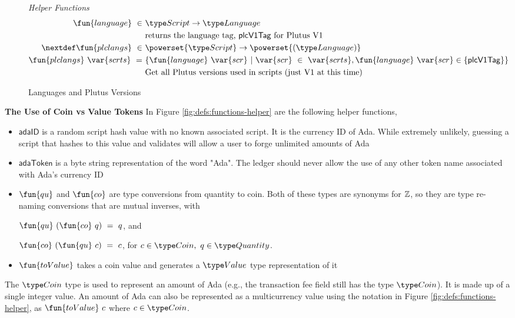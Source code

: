 \begin{figure*}[htb]
  \emph{Helper Functions}
  \begin{align*}
    \fun{language} ~\in~& \Script \to \Language \\
    &\text{returns the language tag, $\mathsf{plcV1Tag}$ for Plutus V1} \\
    \nextdef
    \fun{plclangs} ~\in~& \powerset{\Script} \to \powerset{(\Language)} \\
    \fun{plclangs}~ \var{scrts} ~=~ & \{ \fun{language}~\var{scr} ~\vert~
      \var{scr}~\in~ \var{scrts}, \fun{language}~\var{scr} \in \{\mathsf{plcV1Tag} \}  \}\\
    &\text{Get all Plutus versions used in scripts (just V1 at this time)} \\
  \end{align*}
  \caption{Languages and Plutus Versions}
  \label{fig:defs:functions-chain-helper}
\end{figure*}

\textbf{The Use of Coin vs Value Tokens}
In Figure \ref{fig:defs:functions-helper} are the following helper functions,

\begin{itemize}
  \item $\mathsf{adaID}$ is a random script hash value with no known associated
  script. It is the currency ID of Ada. While extremely unlikely, guessing a
  script that hashes to this value
  and validates will allow a user to forge unlimited amounts of Ada
  \item $\mathsf{adaToken}$ is a byte string representation of the word "Ada".
  The ledger should never allow the use of any other token name associated
  with Ada's currency ID
  \item $\fun{qu}$ and $\fun{co}$ are type conversions from quantity to
  coin. Both of these types are synonyms for $\mathbb{Z}$, so they are
  type re-naming conversions that are mutual inverses, with

  $\fun{qu} ~(\fun{co} ~q )~= ~q$, and

  $\fun{co}~ (\fun{qu}~ c) ~=~ c$, for $c \in \Coin,~q \in \Quantity$.

  \item $\fun{toValue}$ takes a coin value and generates a $\Value$ type representation
  of it
\end{itemize}

The $\Coin$ type is used to represent an amount of Ada (e.g., the transaction
fee field still has the type $\Coin$). It is made up of a single
integer value. An amount of Ada can also be represented as a multicurrency value
using the notation in Figure \ref{fig:defs:functions-helper}, as
$\fun{toValue}~c$ where $c \in \Coin$.


